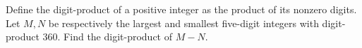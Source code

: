 Define the digit-product of a positive integer as the product of its nonzero digits. Let $M,N$ be respectively the largest and smallest five-digit integers with digit-product $360$. Find the digit-product of $M-N$.
